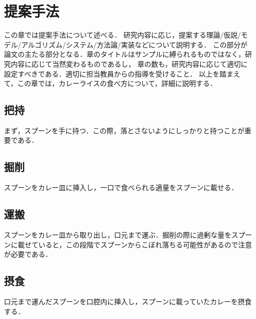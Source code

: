 \chapter{提案手法}	%
\thispagestyle{plain}   %

この章では提案手法について述べる．
研究内容に応じ，提案する理論/仮説/モデル/アルゴリズム/システム/方法論/実装などについて説明する．
この部分が論文の主たる部分となる．章のタイトルはサンプルに縛られるものではなく，研究内容に応じて当然変わるものであるし，
章の数も，研究内容に応じて適切に設定すべきである．適切に担当教員からの指導を受けること．
以上を踏まえて，この章では，カレーライスの食べ方について，詳細に説明する．

\section{把持}
まず，スプーンを手に持つ．この際，落とさないようにしっかりと持つことが重要である．

\section{掘削}
スプーンをカレー皿に挿入し，一口で食べられる適量をスプーンに載せる．

\section{運搬}
スプーンをカレー皿から取り出し，口元まで運ぶ．掘削の際に過剰な量をスプーンに載せていると，この段階でスプーンからこぼれ落ちる可能性があるので注意が必要である．

\section{摂食}
口元まで運んだスプーンを口腔内に挿入し，スプーンに載っていたカレーを摂食する．

